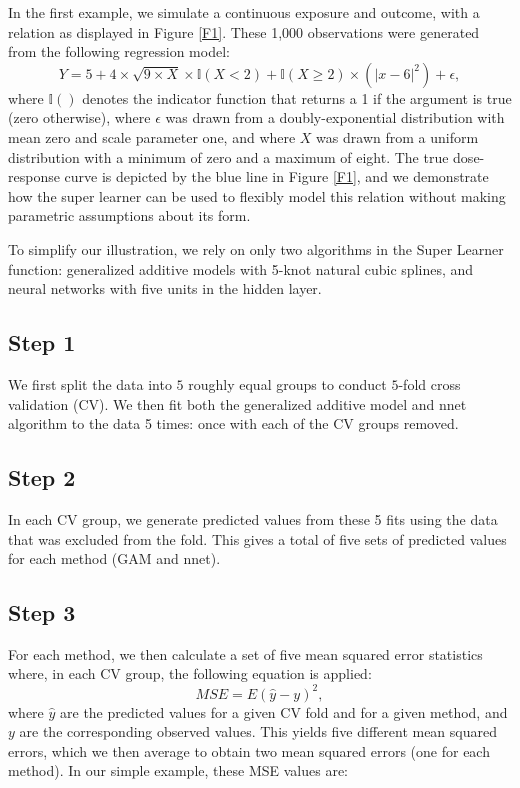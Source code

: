 \documentclass[12pt]{article}
\begin{document}
In the first example, we simulate a continuous exposure and outcome, with a relation as displayed in Figure \ref{F1}. These 1,000 observations were generated from the following regression model:
\begin{equation}
	Y = 5 + 4\times\sqrt{9 \times X}\times \mathbb{I}(X<2) + \mathbb{I}(X\geq 2)\times(|x-6|^2) + \epsilon,
\end{equation}
where $\mathbb{I}()$ denotes the indicator function that returns a 1 if the argument is true (zero otherwise), where $\epsilon$ was drawn from a doubly-exponential distribution with mean zero and scale parameter one, and where $X$ was drawn from a uniform distribution with a minimum of zero and a maximum of eight. The true dose-response curve is depicted by the blue line in Figure \ref{F1}, and we demonstrate how the super learner can be used to flexibly model this relation without making parametric assumptions about its form.

To simplify our illustration, we rely on only two algorithms in the Super Learner function: generalized additive models with 5-knot natural cubic splines,\cite{Hastie1990} and neural networks with five units in the hidden layer.\cite{Hastie2009}

\subsection*{Step 1}

We first split the data into $5$ roughly equal groups to conduct $5$-fold cross validation (CV). We then fit both the generalized additive model and nnet algorithm to the data 5 times: once with each of the CV groups removed. 

\subsection*{Step 2}

In each CV group, we generate predicted values from these 5 fits using the data that was excluded from the fold. This gives a total of five sets of predicted values for each method (GAM and nnet).

\subsection*{Step 3}

For each method, we then calculate a set of five mean squared error statistics where, in each CV group, the following equation is applied:
\begin{equation}
	MSE = E(\hat{y} - y)^2,
\end{equation}
where $\hat{y}$ are the predicted values for a given CV fold and for a given method, and $y$ are the corresponding observed values. This yields five different mean squared errors, which we then average to obtain two mean squared errors (one for each method). In our simple example, these MSE values are:
\end{document}

